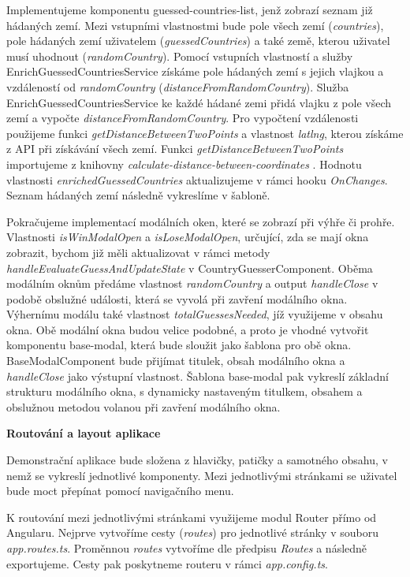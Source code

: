 Implementujeme komponentu guessed-countries-list, jenž zobrazí seznam již hádaných zemí. 
Mezi vstupními vlastnostmi bude pole všech zemí (\emph{countries}), pole hádaných zemí uživatelem (\emph{guessedCountries}) a také země, kterou uživatel musí uhodnout (\emph{randomCountry}).
Pomocí vstupních vlastností a služby EnrichGuessedCountriesService získáme pole hádaných zemí s jejich vlajkou a vzdáleností od \emph{randomCountry} (\emph{distanceFromRandomCountry}).
Služba EnrichGuessedCountriesService ke každé hádané zemi přidá vlajku z pole všech zemí a vypočte \emph{distanceFromRandomCountry}. 
Pro vypočtení vzdálenosti použijeme funkci \emph{getDistanceBetweenTwoPoints} a vlastnost \emph{latlng}, kterou získáme z API při získávání všech zemí. 
Funkci \emph{getDistanceBetweenTwoPoints} importujeme z knihovny \emph{calculate-distance-between-coordinates} \cite{distancebetweencoordinates}. 
Hodnotu vlastnosti \emph{enrichedGuessedCountries} aktualizujeme v rámci hooku \emph{OnChanges}. Seznam hádaných zemí následně vykreslíme v šabloně.

Pokračujeme implementací modálních oken, které se zobrazí při výhře či prohře. 
Vlastnosti \emph{isWinModalOpen} a \emph{isLoseModalOpen}, určující, zda se mají okna zobrazit, bychom již měli aktualizovat v rámci metody \emph{handleEvaluateGuessAndUpdateState} v CountryGuesserComponent. 
Oběma modálním oknům předáme vlastnost \emph{randomCountry} a output \emph{handleClose} v podobě obslužné události, která se vyvolá při zavření modálního okna. 
Výhernímu modálu také vlastnost \emph{totalGuessesNeeded}, jíž využijeme v obsahu okna. 
Obě modální okna budou velice podobné, a proto je vhodné vytvořit komponentu base-modal, která bude sloužit jako šablona pro obě okna. 
BaseModalComponent bude přijímat titulek, obsah modálního okna a \emph{handleClose} jako výstupní vlastnost. 
Šablona base-modal pak vykreslí základní strukturu modálního okna, s dynamicky nastaveným titulkem, obsahem a obslužnou metodou volanou při zavření modálního okna.

\begin{flushleft}
  \textbf{Routování a layout aplikace}
\end{flushleft}

Demonstrační aplikace bude složena z hlavičky, patičky a samotného obsahu, v nemž se vykreslí jednotlivé komponenty. 
Mezi jednotlivými stránkami se uživatel bude moct přepínat pomocí navigačního menu.

K routování mezi jednotlivými stránkami využijeme modul Router přímo od Angularu. Nejprve vytvoříme cesty (\emph{routes}) pro jednotlivé stránky v souboru \emph{app.routes.ts}. 
Proměnnou \emph{routes} vytvoříme dle předpisu \emph{Routes} a následně exportujeme. Cesty pak poskytneme routeru v rámci \emph{app.config.ts}.

